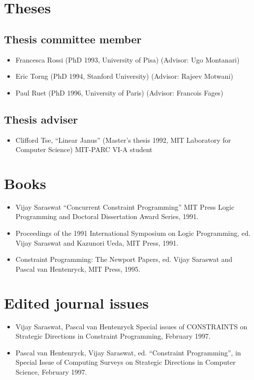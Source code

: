 \documentclass{article}
\begin{document}
\section*{Theses}
\subsection*{Thesis committee member}
\begin{itemize}
\item  Francesca Rossi (PhD 1993, University of Pisa) (Advisor: Ugo Montanari)
\item  Eric Torng (PhD 1994, Stanford University) (Advisor: Rajeev Motwani)
\item  Paul Ruet (PhD 1996, University of Paris) (Advisor: Francois Fages)
\end{itemize}

\subsection*{Thesis adviser}
\begin{itemize}

\item  Clifford Tse, ``Linear Janus'' (Master's thesis 1992, MIT Laboratory for
  Computer Science) MIT-PARC VI-A student

\end{itemize}

\section*{Books}
\begin{itemize}
\item   Vijay Saraswat ``Concurrent Constraint Programming'' MIT
  Press Logic Programming and Doctoral Dissertation Award Series,
  1991.

\item   Proceedings of the 1991 International Symposium on Logic
  Programming, ed.{} Vijay Saraswat and Kazunori Ueda, MIT Press,
  1991.

\item  Constraint Programming: The Newport Papers, ed.{} Vijay
  Saraswat and Pascal van Hentenryck, MIT Press, 1995.
\end{itemize}
\section*{Edited journal issues}
\begin{itemize}
\item  Vijay Saraswat, Pascal van Hentenryck Special issues of
  CONSTRAINTS on Strategic Directions in Constraint Programming,
  February 1997.

\item  Pascal van Hentenryck, Vijay Saraswat, ed. ``Constraint
  Programming'', in Special Issue of Computing Surveys on
  Strategic Directions in Computer Science, February 1997.
\end{itemize}
\end{document}
